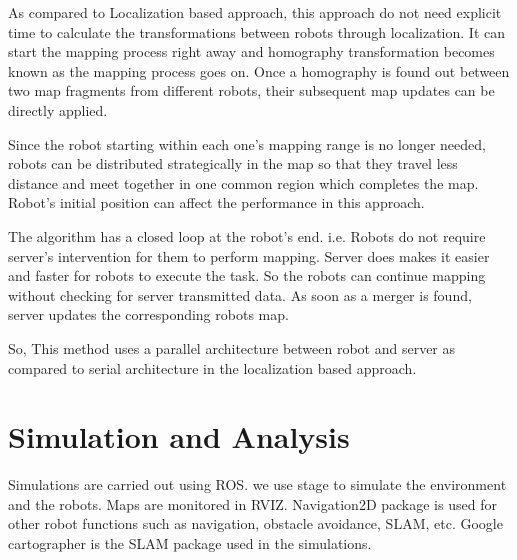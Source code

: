 \documentclass[MTech]{iitmdiss}
\begin{document}
As compared to Localization based approach, this approach do not need explicit time to calculate the transformations between robots through localization. It can start the mapping process right away and homography transformation becomes known as the mapping process goes on. Once a homography is found out between two map fragments from different robots, their subsequent map updates can be directly applied. \par
Since the robot starting within each one's mapping range is no longer needed, robots can be distributed strategically in the map so that they travel less distance and meet together in one common region which completes the map. Robot's initial position can affect the performance in this approach.\par 
The algorithm has a closed loop at the robot's end. i.e. Robots do not require server's intervention for them to perform mapping. Server does makes it easier and faster for robots to execute the task. So the robots can continue mapping without checking for server transmitted data. As soon as a merger is found, server updates the corresponding robots map.\par
So, This method uses a parallel architecture between robot and server as compared to serial architecture in the localization based approach.\par

\section{Simulation and Analysis}

Simulations are carried out using ROS. we use stage to simulate the environment and the robots. Maps are monitored in RVIZ. Navigation2D package is used for other robot functions such as navigation, obstacle avoidance, SLAM, etc. Google cartographer is the SLAM package used in the simulations.
\end{document}
